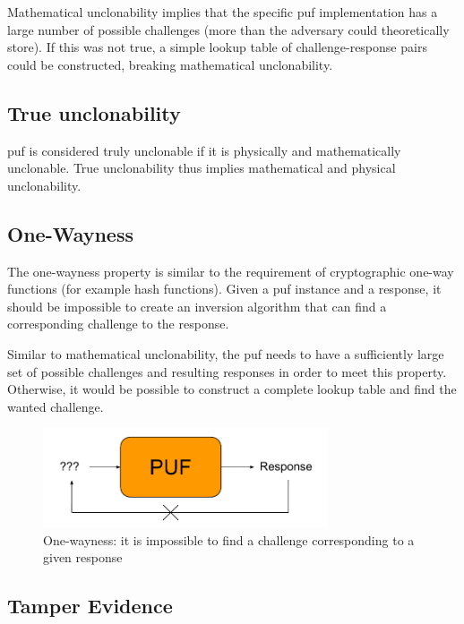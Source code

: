 Mathematical unclonability implies that the specific \gls{puf} implementation has a large number of possible challenges (more than the adversary could theoretically store). If this was not true, a simple lookup table of challenge-response pairs could be constructed, breaking mathematical unclonability.

\subsection*{True unclonability}

\gls{puf} is considered truly unclonable if it is physically and mathematically unclonable. True unclonability thus implies mathematical and physical unclonability.

\subsection*{One-Wayness}

The one-wayness property is similar to the requirement of cryptographic one-way functions (for example hash functions). Given a \gls{puf} instance and a response, it should be impossible to create an inversion algorithm that can find a corresponding challenge to the response.

Similar to mathematical unclonability, the \gls{puf} needs to have a sufficiently large set of possible challenges and resulting responses in order to meet this property. Otherwise, it would be possible to construct a complete lookup table and find the wanted challenge.

\begin{figure}[h!]
    \centering
    \captionsetup{justification=centering,margin=0.5cm}
    \includegraphics[width=0.75\textwidth]{images/one-wayness}
    \caption{One-wayness: it is impossible to find a challenge corresponding to a given response}
    \label{fig:one-wayness}
\end{figure}

\subsection*{Tamper Evidence}

